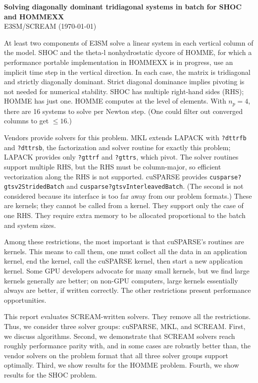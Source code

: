\documentclass[10pt,twocolumn]{article}
\begin{document}
\sloppy

\begin{center}
  {\bf Solving diagonally dominant tridiagonal systems in batch for SHOC and HOMMEXX} \\
  E3SM/SCREAM (\today)
\end{center}

At least two components of E3SM solve a linear system in each vertical column of the model.
SHOC and the theta-l nonhydrostatic dycore of HOMME,
for which a performance portable implementation in HOMMEXX is in progress,
use an implicit time step in the vertical direction.
In each case, the matrix is tridiagonal and strictly diagonally dominant.
Strict diagonal dominance implies pivoting is not needed for numerical stability.
SHOC has multiple right-hand sides (RHS); HOMME has just one.
HOMME computes at the level of elements.
With $n_p = 4$, there are 16 systems to solve per Newton step.
(One could filter out converged columns to get $\le 16$.)

Vendors provide solvers for this problem.
MKL extends LAPACK with {\tt ?dttrfb} and {\tt ?dttrsb}, the factorization and solver routine for exactly this problem;
LAPACK provides only {\tt ?gttrf} and {\tt ?gttrs}, which pivot.
The solver routines support multiple RHS,
but the RHS must be column-major, so efficient vectorization along the RHS is not supported.
cuSPARSE provides {\tt cusparse?gtsv2StridedBatch} and {\tt cusparse?gtsvInterleavedBatch}.
(The second is not considered because its interface is too far away from our problem formats.)
These are kernels; they cannot be called from a kernel.
They support only the case of one RHS.
They require extra memory to be allocated proportional to the batch and system sizes.

Among these restrictions, the most important is that cu\-SPARSE's routines are kernels.
This means to call them, one must collect all the data in an application kernel,
end the kernel, call the cuSPARSE kernel, then start a new application kernel.
Some GPU developers advocate for many small kernels,
but we find large kernels generally are better;
on non-GPU computers, large kernels essentially always are better, if written correctly.
The other restrictions present performance opportunities.

This report evaluates SCREAM-written solvers.
They remove all the restrictions.
Thus, we consider three solver groups: cuSPARSE, MKL, and SCREAM.
First, we discuss algorithms.
Second, we demonstrate that SCREAM solvers reach roughly performance parity with,
and in some cases are robustly better than,
the vendor solvers on the problem format that all three solver groups support optimally.
Third, we show results for the HOMME problem.
Fourth, we show results for the SHOC problem.
\end{document}
